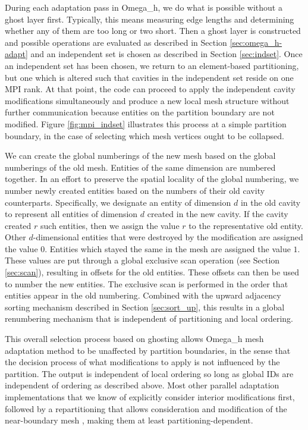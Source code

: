 During each adaptation pass in Omega\_h, we do what is possible without a ghost
layer first. Typically, this means measuring edge lengths and determining
whether any of them are too long or two short.
Then a ghost layer is constructed and possible operations are evaluated
as described in Section \ref{sec:omega_h-adapt} and
an independent set is chosen as described in Section \ref{sec:indset}.
Once an independent set has been chosen, we return to an element-based
partitioning, but one which is altered such that cavities in the independent
set reside on one MPI rank.
At that point, the code can proceed to apply the independent cavity modifications
simultaneously and produce a new local mesh structure without further communication
because entities on the partition boundary are not modified.
Figure \ref{fig:mpi_indset} illustrates this process at a simple partition boundary,
in the case of selecting which mesh vertices ought to be collapsed.

We can create the global numberings of the new mesh based on the global
numberings of the old mesh.
Entities of the same dimension are numbered together.
In an effort to preserve the spatial locality of the global numbering,
we number newly created entities based on the numbers of their old
cavity counterparts.
Specifically, we designate an entity of dimension $d$ in the old cavity
to represent all entities of dimension $d$ created in the new cavity.
If the cavity created $r$ such entities, then we assign the value
$r$ to the representative old entity.
Other $d$-dimensional entities that were destroyed by the modification
are assigned the value $0$.
Entities which stayed the same in the mesh are assigned the value $1$.
These values are put through a global exclusive scan operation
(see Section \ref{sec:scan}), resulting in offsets for the old entities.
These offsets can then be used to number the new entities.
The exclusive scan is performed in the order that entities appear
in the old numbering.
Combined with the upward adjacency sorting mechanism described
in Section \ref{sec:sort_up}, this results in a global renumbering
mechanism that is independent of partitioning and local ordering.

This overall selection process based on ghosting allows
Omega\_h mesh adaptation method to be unaffected by partition boundaries,
in the sense that the decision process of what modifications to apply
is not influenced by the partition.
The output is independent
of local ordering so long as global IDs are independent of ordering
as described above.
Most other parallel adaptation implementations that we know of explicitly
consider interior modifications first, followed by a repartitioning that
allows consideration and modification of the near-boundary mesh
\cite{loseille2015parallel,de1999parallel}, making them
at least partitioning-dependent.

